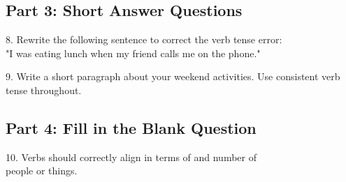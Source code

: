 \documentclass[12pt]{article}
\begin{document}
\vspace{1cm}

\subsection*{Part 3: Short Answer Questions}

8. Rewrite the following sentence to correct the verb tense error:  
\\"I was eating lunch when my friend calls me on the phone."  
\vspace{3cm}

9. Write a short paragraph about your weekend activities. Use consistent verb \\tense throughout.  
\vspace{5cm}

\subsection*{Part 4: Fill in the Blank Question}

10. Verbs should correctly align in terms of  \underline{\hspace{4cm}} and number of \\people or things.  
\vspace{2cm}








\end{document}
